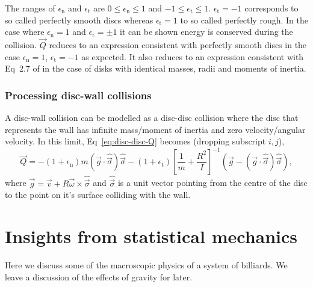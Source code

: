 \documentclass{article}
\begin{document}
The ranges of $\epsilon_\mathrm{n}$ and $\epsilon_\mathrm{t}$ are $0 \leq \epsilon_\mathrm{n} \leq 1$ and $-1 \leq \epsilon_\mathrm{t} \leq 1$. $\epsilon_\mathrm{t} = -1$ corresponds to so called perfectly smooth discs whereas $\epsilon_\mathrm{t} = 1$ to so called perfectly rough. In the case where $\epsilon_\mathrm{n} = 1$ and $\epsilon_\mathrm{t} = \pm 1$ it can be shown energy is conserved during the collision. $\vec{Q}$ reduces to an expression consistent with perfectly smooth discs in the case $\epsilon_\mathrm{n} = 1$, $\epsilon_\mathrm{t} = -1$ as expected. It also reduces to an expression consistent with Eq~2.7 of \cite{Kremer-2014} in the case of disks with identical masses, radii and moments of inertia.

\subsubsection{Processing disc-wall collisions}
A disc-wall collision can be modelled as a disc-disc collision where the disc that represents the wall has infinite mass/moment of inertia and zero velocity/angular velocity. In this limit, Eq~\ref{eq:disc-disc-Q} becomes (dropping subscript $i, j$),
\begin{equation}
    \vec{Q}
    =
    -(1 + \epsilon_\mathrm{n})
    m
    (\vec{g} \cdot \hat{\vec{\sigma}}) \hat{\vec{\sigma}}
    -
    (1+\epsilon_\mathrm{t})
    \left[
        \frac{1}{m}
        +
        \frac{R^2}{I}
    \right]^{-1}
    \left(
        \vec{g} - (\vec{g} \cdot \hat{\vec{\sigma}}) \hat{\vec{\sigma}}
    \right),
\end{equation}
where $\vec{g} = \vec{v} + R \vec{\omega} \times \hat{\vec{\sigma}}$ and $\hat{\vec{\sigma}}$ is a unit vector pointing from the centre of the disc to the point on it's surface colliding with the wall.

\section{Insights from statistical mechanics}
Here we discuss some of the macroscopic physics of a system of billiards. We leave a discussion of the effects of gravity for later.
\end{document}
